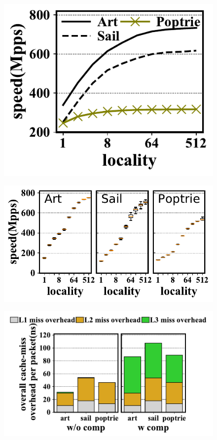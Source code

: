 \documentclass[a4paper]{article}
\begin{document}
    \begin{figure}[htbp]
        \includegraphics{../result/example.pdf}
    \end{figure}

    \begin{figure}[htbp]
        \includegraphics{../result/example2.pdf}
    \end{figure}

    \begin{figure}[htbp]
        \includegraphics{../result/example3.pdf}
    \end{figure}
\end{document}
